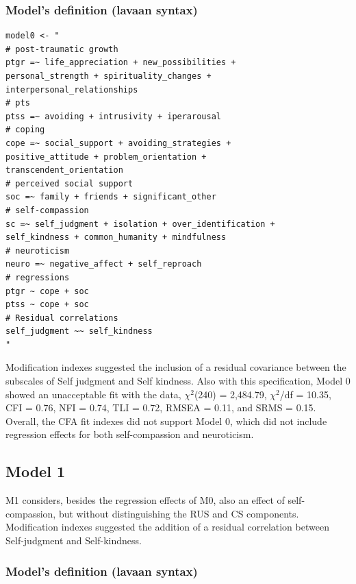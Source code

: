 \documentclass[
  english,
  man,floatsintext]{apa7}
\begin{document}
\begin{appendix}
\hypertarget{models-definition-lavaan-syntax}{%
\subsubsection{Model's definition (lavaan
syntax)}\label{models-definition-lavaan-syntax}}

\begin{verbatim}
model0 <- "
# post-traumatic growth
ptgr =~ life_appreciation + new_possibilities + 
personal_strength + spirituality_changes + 
interpersonal_relationships
# pts
ptss =~ avoiding + intrusivity + iperarousal
# coping
cope =~ social_support + avoiding_strategies + 
positive_attitude + problem_orientation + 
transcendent_orientation
# perceived social support
soc =~ family + friends + significant_other
# self-compassion
sc =~ self_judgment + isolation + over_identification +
self_kindness + common_humanity + mindfulness
# neuroticism
neuro =~ negative_affect + self_reproach
# regressions
ptgr ~ cope + soc  
ptss ~ cope + soc 
# Residual correlations
self_judgment ~~ self_kindness
"
\end{verbatim}

Modification indexes suggested the inclusion of a residual covariance
between the subscales of Self judgment and Self kindness. Also with this
specification, Model 0 showed an unacceptable fit with the data,
\(\chi^2\)(240) = 2,484.79, \(\chi^2\)/df = 10.35, CFI = 0.76, NFI =
0.74, TLI = 0.72, RMSEA = 0.11, and SRMS = 0.15. Overall, the CFA fit
indexes did not support Model 0, which did not include regression
effects for both self-compassion and neuroticism.

\newpage

\hypertarget{model-1}{%
\subsection{Model 1}\label{model-1}}

M1 considers, besides the regression effects of M0, also an effect of
self-compassion, but without distinguishing the RUS and CS components.
Modification indexes suggested the addition of a residual correlation
between Self-judgment and Self-kindness.

\hypertarget{models-definition-lavaan-syntax-1}{%
\subsubsection{Model's definition (lavaan
syntax)}\label{models-definition-lavaan-syntax-1}}


\end{appendix}
\end{document}
